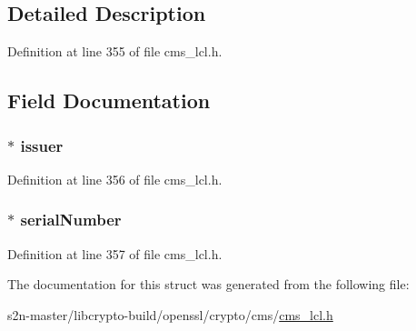 \subsection{Detailed Description}


Definition at line 355 of file cms\+\_\+lcl.\+h.



\subsection{Field Documentation}
\subsubsection[{\texorpdfstring{issuer}{issuer}}]{$\ast$ issuer}\hypertarget{struct_c_m_s___issuer_and_serial_number__st_ac70a3f67417db441f9e4fb607e5390de}{}\label{struct_c_m_s___issuer_and_serial_number__st_ac70a3f67417db441f9e4fb607e5390de}


Definition at line 356 of file cms\+\_\+lcl.\+h.

\subsubsection[{\texorpdfstring{serial\+Number}{serialNumber}}]{$\ast$ serial\+Number}\hypertarget{struct_c_m_s___issuer_and_serial_number__st_a574666772e12f5202cce61de15eaaa4e}{}\label{struct_c_m_s___issuer_and_serial_number__st_a574666772e12f5202cce61de15eaaa4e}


Definition at line 357 of file cms\+\_\+lcl.\+h.



The documentation for this struct was generated from the following file\+:\begin{DoxyCompactItemize}
\item 
s2n-\/master/libcrypto-\/build/openssl/crypto/cms/\hyperlink{cms__lcl_8h}{cms\+\_\+lcl.\+h}\end{DoxyCompactItemize}
